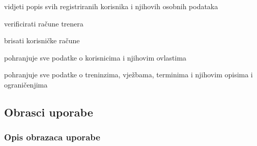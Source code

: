 \begin{packed_enum}
				
				\item  {}
				
				\begin{packed_enum}
					
					\item vidjeti popis svih registriranih korisnika i njihovih osobnih podataka
					\item verificirati račune trenera
					\item brisati korisničke račune
				
					
				\end{packed_enum}
				
				
				\item  {}
				
				\begin{packed_enum}
					
					\item pohranjuje sve podatke o korisnicima i njihovim ovlastima
					\item pohranjuje sve podatke o treninzima, vježbama, terminima i njihovim opisima i ograničenjima
				
					
				\end{packed_enum}
				
			\end{packed_enum}
			
			\eject 
			
			
				
			\subsection{Obrasci uporabe}
				
				
				\subsubsection{Opis obrazaca uporabe}
					
